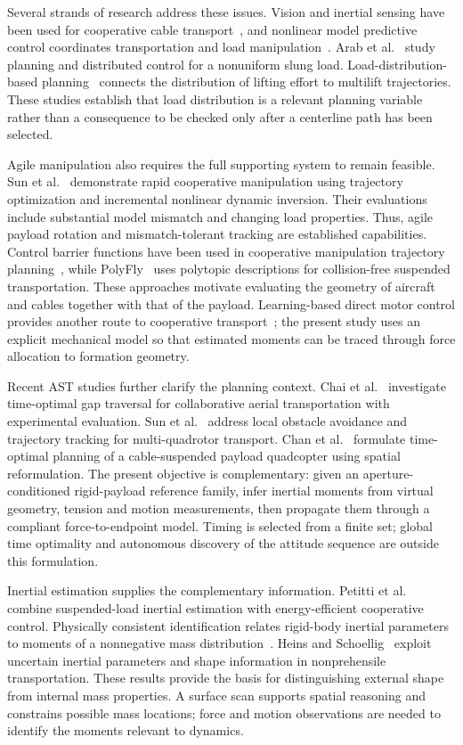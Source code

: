 Several strands of research address these issues. Vision and inertial sensing have been used for cooperative cable transport~\cite{li2021}, and nonlinear model predictive control coordinates transportation and load manipulation~\cite{nmpc2023}. Arab et al.~\cite{ast2021} study planning and distributed control for a nonuniform slung load. Load-distribution-based planning~\cite{geng2022} connects the distribution of lifting effort to multilift trajectories. These studies establish that load distribution is a relevant planning variable rather than a consequence to be checked only after a centerline path has been selected.

Agile manipulation also requires the full supporting system to remain feasible. Sun et al.~\cite{sun2025} demonstrate rapid cooperative manipulation using trajectory optimization and incremental nonlinear dynamic inversion. Their evaluations include substantial model mismatch and changing load properties. Thus, agile payload rotation and mismatch-tolerant tracking are established capabilities. Control barrier functions have been used in cooperative manipulation trajectory planning~\cite{pallar2025}, while PolyFly~\cite{polyfly2026} uses polytopic descriptions for collision-free suspended transportation. These approaches motivate evaluating the geometry of aircraft and cables together with that of the payload. Learning-based direct motor control provides another route to cooperative transport~\cite{crazymarl2026}; the present study uses an explicit mechanical model so that estimated moments can be traced through force allocation to formation geometry.

Recent AST studies further clarify the planning context. Chai et al.~\cite{chai2026} investigate time-optimal gap traversal for collaborative aerial transportation with experimental evaluation. Sun et al.~\cite{sunlocal2026} address local obstacle avoidance and trajectory tracking for multi-quadrotor transport. Chan et al.~\cite{chan2026} formulate time-optimal planning of a cable-suspended payload quadcopter using spatial reformulation. The present objective is complementary: given an aperture-conditioned rigid-payload reference family, infer inertial moments from virtual geometry, tension and motion measurements, then propagate them through a compliant force-to-endpoint model. Timing is selected from a finite set; global time optimality and autonomous discovery of the attitude sequence are outside this formulation.

Inertial estimation supplies the complementary information. Petitti et al.~\cite{petitti2020} combine suspended-load inertial estimation with energy-efficient cooperative control. Physically consistent identification relates rigid-body inertial parameters to moments of a nonnegative mass distribution~\cite{wensing2018}. Heins and Schoellig~\cite{heins2025} exploit uncertain inertial parameters and shape information in nonprehensile transportation. These results provide the basis for distinguishing external shape from internal mass properties. A surface scan supports spatial reasoning and constrains possible mass locations; force and motion observations are needed to identify the moments relevant to dynamics.

